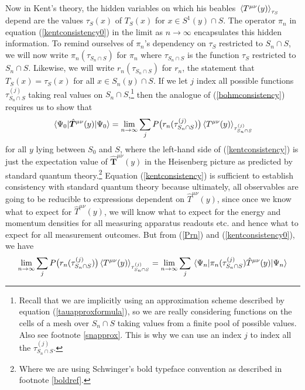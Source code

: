 Now in Kent's theory, the hidden variables on which his beables $\ev*{T^{\mu\nu}(y)}_{\tau_S}$ depend are the values $\tau_S(x)$ of $T_S(x)$ for $x\in S^1(y)\cap S$. The operator $\pi_n$ in equation (\ref{kentconsistency0}) in the limit as $n\rightarrow\infty$ encapsulates this hidden information. To remind ourselves of $\pi_n$'s dependency on $\tau_S$ restricted to $S_n\cap S$, we will now write $\pi_n(\tau_{S_n\cap S})$ for $\pi_n$ where $\tau_{S_n\cap S}$ is the function $\tau_S$ restricted to $S_n\cap S$. Likewise, we will write  $r_n(\tau_{S_n\cap S})$ for $r_n$, the statement that $T_S(x)=\tau_S(x)$ for all $x\in S_n(y)\cap S$. If we let $j$ index all possible functions $\tau^{(j)}_{S_n\cap S}$ taking real values on $S_n\cap S$,\footnote{Recall that we are implicitly using an approximation scheme described by equation (\ref{tauapproxformula}), so we are really considering functions on the cells of a mesh over $S_n\cap S $ taking values from a finite pool of possible values. Also see footnote \ref{snapprox}. This is why we can use an index $j$ to index all the $\tau^{(j)}_{S_n\cap S}.$ } then the analogue of (\ref{bohmconsistency}) requires us to show that 
\begin{equation}\label{kentconsistency}
\ev*{\hat{\bm{T}}^{\mu\nu}(y)}{\Psi_0}=\lim_{n\rightarrow\infty}\sum_{j}P\big(r_n(\tau^{(j)}_{S_n\cap S})\big)\ev*{T^{\mu\nu}(y)}_{\tau^{(j)}_{S_n\cap S}}
\end{equation}
for all $y$ lying between $S_0$ and $S$, where the left-hand side of (\ref{kentconsistency}) is just the expectation value of $\hat{\bm{T}}^{\mu\nu}(y)$ in the Heisenberg picture as predicted by standard quantum theory.\footnote{Where we are using Schwinger's bold typeface convention as described in footnote \ref{boldref}.} Equation (\ref{kentconsistency}) is sufficient to establish consistency with standard quantum theory because ultimately, all observables are going to be reducible to expressions dependent on $\hat{T}^{\mu\nu}(y)$, since once we know what to expect for $\hat{T}^{\mu\nu}(y)$, we will know what to expect for the energy and momentum densities for all measuring apparatus readouts etc. and hence what to expect for all measurement outcomes. But from (\ref{Prn}) and (\ref{kentconsistency0}), we have 
\begin{equation}\label{kentconsistency1}
\lim_{n\rightarrow\infty}\sum_jP\big(r_n(\tau^{(j)}_{S_n\cap S})\big)\ev*{T^{\mu\nu}(y)}_{\tau^{(j)}_{S_n\cap S}}=\lim_{n\rightarrow\infty}\sum_{j}{\ev*{\pi_{n}(\tau^{(j)}_{S_n\cap S})\hat{T}^{\mu\nu}(y)}{\Psi_n}}
\end{equation}
